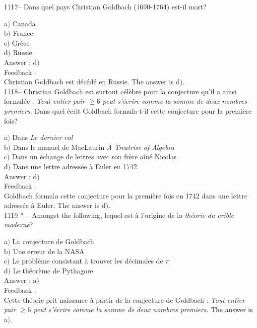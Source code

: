 ﻿\documentclass[letterpaper, 12pt]{article}
\begin{document}
1117-- Dans quel pays Christian Goldbach (1690-1764) est-il mort?

a$)$ Canada \\
b$)$ France  \\
c$)$ Gr\`ece \\
d$)$ Russie \\

Answer : d$)$\\

Feedback : \\
Christian Goldbach est d\'ec\'ed\'e en Russie. The answer is d$)$.\\

1118-- Christian Goldbach est surtout c\'el\`ebre pour la conjecture
qu'il a ainsi formul\'ee : {\sl Tout entier pair $\ge6$ peut
s'\'ecrire comme la somme de deux nombres premiers.} Dans quel
\'ecrit Goldbach formula-t-il cette conjecture pour la premi\`ere
fois?

a$)$ Dans {\sl Le dernier vol} \\
b$)$ Dans le manuel de MacLaurin {\sl A Treatrise of Algebra} \\
c$)$ Dans un \'echange de lettres avec son fr\`ere a\^in\'e Nicolas \\
d$)$ Dans une lettre adress\'ee \`a Euler en 1742 \\

Answer : d$)$\\

Feedback : \\
Goldbach formula cette conjecture pour la premi\`ere fois en 1742 dans une
lettre adress\'ee \`a Euler. The answer is d$)$.\\

1119 * -- Amongst the following, lequel est \`a
l'origine de la {\sl th\'eorie du crible moderne}?

a$)$ La conjecture de Goldbach \\
b$)$ Une erreur de la NASA  \\
c$)$ Le probl\`eme consistant \`a trouver les d\'ecimales de $\pi$ \\
d$)$ Le th\'eor\`eme de Pythagore \\

Answer : a$)$\\

Feedback : \\
Cette th\'eorie prit naissance \`a partir de la conjecture de
Goldbach : {\sl Tout entier pair $\ge6$ peut s'\'ecrire comme la
somme de deux nombres premiers.}
The answer is a$)$.\\
\end{document}
